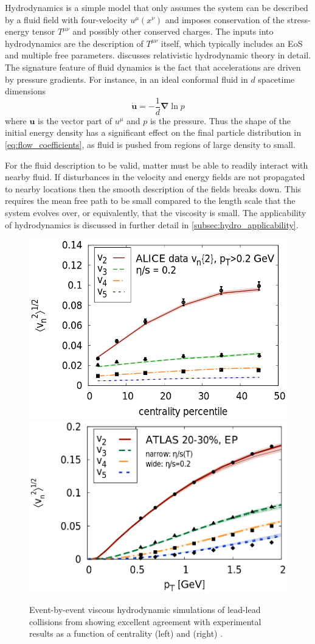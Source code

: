 Hydrodynamics is a simple model that only assumes the system can be described by a fluid field with four-velocity $u^\mu(x^\nu)$ and imposes conservation of the stress-energy tensor $T^{\mu\nu}$ and possibly other conserved charges. %
The inputs into hydrodynamics are the description of $T^{\mu\nu}$ itself, which typically includes an \ac{EoS} and multiple free parameters.
 discusses relativistic hydrodynamic theory in detail.
The signature feature of fluid dynamics is the fact that accelerations are driven by pressure gradients.
For instance, in an ideal conformal fluid in $d$ spacetime dimensions
\begin{equation}
\dot{\mathbf{u}} = - \frac{1}{d} \boldsymbol{\nabla} \ln p
\end{equation}
where $\mathbf{u}$ is the vector part of $u^\mu$ and $p$ is the pressure.
Thus the shape of the initial energy density has a significant effect on the final particle distribution in \cref{eq:flow_coefficients}, as fluid is pushed from regions of large density to small.

For the fluid description to be valid, matter must be able to readily interact with nearby fluid.
If disturbances in the velocity and energy fields are not propagated to nearby locations then the smooth description of the fields breaks down.
This requires the mean free path \mfp to be small compared to the length scale that the system evolves over, or equivalently, that the viscosity is small.
The applicability of hydrodynamics is discussed in further detail in \cref{subsec:hydro_applicability}.

\begin{figure}[t]
  \includegraphics[width=0.49\linewidth]{vn_vs_cent.png}
  \includegraphics[width=0.49\linewidth]{vn_vs_pt.png}
  \caption{Event-by-event viscous hydrodynamic simulations of lead-lead collisions from  showing excellent agreement with experimental results as a function of centrality (left) \cite{ALICE:2011ab} and \pt (right) \cite{HION-2011-01}.}
  \label{fig:pbpb_vn}
\end{figure}

